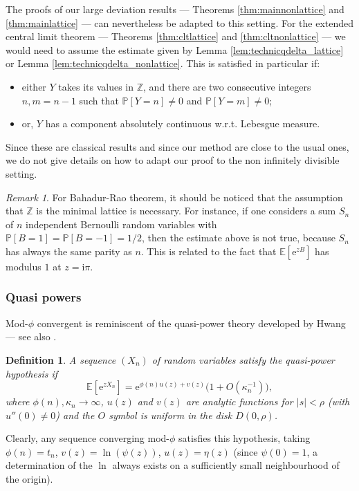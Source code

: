 \documentclass[12pt,a4paper,reqno]{amsart}
\newtheorem{definition}[lemma]{Definition}
\theoremstyle{remark}
\newtheorem{remark}[lemma]{Remark}
\newcommand{\Z}{\mathbb{Z}}
\newcommand{\E}{\mathrm{e}}
\newcommand{\I}{\mathrm{i}}
\newcommand{\esper}{\mathbb{E}}
\newcommand{\proba}{\mathbb{P}}
\def\ka{\kappa}
\begin{document}
The proofs of our large deviation results --- Theorems \ref{thm:mainnonlattice} and \ref{thm:mainlattice} ---
can nevertheless be adapted to this setting.
For the extended central limit theorem --- Theorems \ref{thm:cltlattice} and \ref{thm:cltnonlattice} ---
we would need to assume the estimate given by
Lemma \ref{lem:technicqdelta_lattice} or Lemma \ref{lem:technicqdelta_nonlattice}.
This is satisfied in particular if:
\begin{itemize}
\item either $Y$ takes its values in $\Z$, and there are two consecutive integers $n,m=n-1$ such that $\proba[Y=n]\neq 0$ and $\proba[Y=m]\neq 0$;\vspace{2mm}
\item or, $Y$ has a component absolutely continuous w.r.t. Lebesgue measure.\vspace{2mm}
\end{itemize}
Since these are classical results and since our method are close to the usual ones,
we do not give details on how to adapt our proof to the non infinitely divisible setting.

\begin{remark}
For Bahadur-Rao theorem,
it should be noticed that the assumption that $\Z$ is the minimal lattice is necessary.
For instance, if one considers a sum $S_n$ of $n$ independent Bernoulli random variables with $\proba[B=1]=\proba[B=-1]=1/2$, then the estimate above is not true, because $S_n$ has always the same parity as $n$. This is related to the fact that $\esper[\E^{zB}]$ has modulus $1$ at $z=\I\pi$.
\end{remark}
\medskip


\subsubsection{Quasi powers}
\label{Subsect:QP}

Mod-$\phi$ convergent is reminiscent of the quasi-power theory
developed by Hwang \cite{Hwa96,Hwa98} --- see also \cite[Chapter IX]{FSe09}.
\begin{definition}\cite{Hwa96}
    A sequence $(X_n)$ of random variables satisfy the quasi-power hypothesis if
    \begin{equation}
        \esper[\E^{zX_n}] = \E^{\phi(n)u(z)+v(z)} \big( 1 +O(\ka_n^{-1}) \big),
        \label{EqHwangQP}
    \end{equation}
    where $\phi(n),\ka_n \to \infty$, $u(z)$ and $v(z)$ are analytic functions for $|s| < \rho$
    (with $u''(0) \ne 0$)
    and the $O$ symbol is uniform in the disk $D(0,\rho)$.    
\end{definition}
Clearly, any sequence converging mod-$\phi$ satisfies this hypothesis,
taking $\phi(n)=t_n$, $v(z)=\ln(\psi(z))$, $u(z)=\eta(z)$
(since $\psi(0)=1$, a determination of the $\ln$ always exists on a sufficiently small neighbourhood of the origin).
\end{document}
